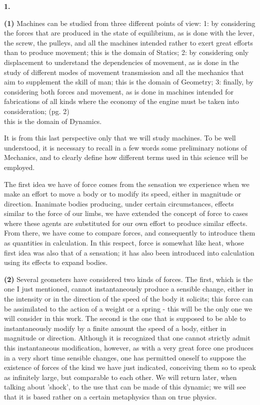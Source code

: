 \documentclass{book}
\begin{document}
\vspace{4mm}
\textbf{1.}
\vspace{4mm} 


\textbf{(1)} Machines can be studied from three different points of view: 1: by considering the forces that are produced in the state of equilibrium, as is done with the lever, the screw, the pulleys, and all the machines intended rather to exert great efforts than to produce movement; this is the domain of Statics; 2: by considering only displacement to understand the dependencies of movement, as is done in the study of different modes of movement transmission and all the mechanics that aim to supplement the skill of man; this 
is the domain of Geometry; 3: finally, by considering both forces and movement, as is done in machines intended for fabrications of all kinds where the economy of the engine must be taken into consideration;
\newpage
(pg. 2) \\
this is the domain of Dynamics.


It is from this last perspective only that we will study machines. To be well understood, it is necessary to recall in a few words some preliminary notions of Mechanics, and to clearly define how different terms used in this science will be employed.

The first idea we have of force comes from the sensation we experience when we make an effort to move a body or to modify its speed, either in magnitude or direction. Inanimate bodies producing, under certain circumstances, effects similar to the force of our limbs, we have extended the concept of force to cases where these agents are substituted for our own effort to produce similar effects. From there, we have come to compare forces, and consequently to introduce them as quantities in calculation. In this respect, force is somewhat like heat, whose first idea was also that of a sensation; it has also been introduced into calculation using its effects to expand bodies.

\textbf{(2)} Several geometers have considered two kinds of forces. The first, which is the one I just mentioned, cannot instantaneously produce a sensible change, either in the intensity or in the direction of the speed of the body it solicits; this force can be assimilated to the action of a weight or a spring - this will be the only one we will consider in this work. The second is the one that is supposed to be able to instantaneously modify by a finite amount the speed of a body, either in magnitude or direction. Although it is recognized that one cannot strictly admit this instantaneous modification, however, as with a very great force one produces in a very short time sensible changes, one has permitted oneself to suppose the existence of forces of the kind we have just indicated, conceiving them so to speak as infinitely large, but comparable to each other. We will return later, when talking about 'shock', to the use that can be made of this dynamic; we will see that it is based rather on a certain metaphysics than on true physics.
\end{document}
